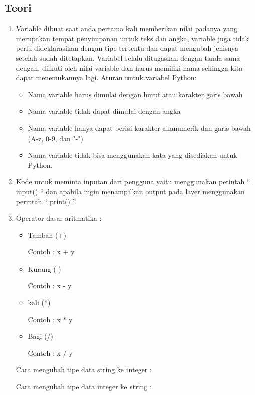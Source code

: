 \subsection{Teori}
\begin{enumerate}
\item Variable dibuat saat anda pertama kali memberikan nilai padanya yang merupakan tempat penyimpanan untuk teks dan angka, variable juga tidak perlu dideklarasikan dengan tipe tertentu dan dapat mengubah jenisnya setelah sudah ditetapkan. Variabel selalu ditugaskan dengan tanda sama dengan, diikuti oleh nilai variable dan harus memiliki nama sehingga kita dapat menemukannya lagi. Aturan untuk variabel Python:

\begin{itemize}
    \item Nama variable harus dimulai dengan huruf atau karakter garis bawah
    \item Nama variable tidak dapat dimulai dengan angka
    \item Nama variable hanya dapat berisi karakter alfanumerik dan garis bawah (A-z, 0-9, dan "-")
    \item Nama variable tidak bisa menggunakan kata yang disediakan untuk Python.
\end{itemize}

    \item Kode untuk meminta inputan dari pengguna yaitu menggunakan perintah “ input()  “  dan apabila ingin menampilkan output pada layer menggunakan perintah “ print() ”.
    \item Operator dasar aritmatika :
    \begin{itemize}
    \item Tambah (+)
     \par Contoh : x + y
    \item Kurang (-)
    \par Contoh : x - y
    \item kali (*)
    \par Contoh : x * y
    \item Bagi (/)
    \par Contoh : x / y
    \end{itemize}
\par Cara mengubah tipe data string ke integer :

\par Cara mengubah tipe data integer ke string :



\end{enumerate}
